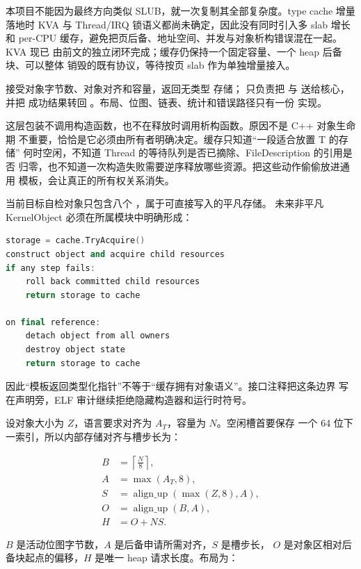 本项目不能因为最终方向类似 SLUB，就一次复制其全部复杂度。type cache 增量
落地时 KVA 与 Thread/IRQ 锁语义都尚未确定，因此没有同时引入多 slab 增长和
per-CPU 缓存，避免把页后备、地址空间、并发与对象析构错误混在一起。KVA 现已
由前文的独立闭环完成；缓存仍保持一个固定容量、一个 heap 后备块、可以整体
销毁的既有协议，等待按页 slab 作为单独增量接入。

 接受对象字节数、对象对齐和容量，返回无类型
存储； 只负责把
 与  送给核心，并把
成功结果转回 。布局、位图、链表、统计和错误路径只有一份
实现。

这层包装不调用构造函数，也不在释放时调用析构函数。原因不是 C++ 对象生命期
不重要，恰恰是它必须由所有者明确决定。缓存只知道“一段适合放置 T 的存储”
何时空闲，不知道 Thread 的等待队列是否已摘除、FileDescription 的引用是否
归零，也不知道一次构造失败需要逆序释放哪些资源。把这些动作偷偷放进通用
模板，会让真正的所有权关系消失。

当前目标自检对象只包含八个 ，属于可直接写入的平凡存储。
未来非平凡 KernelObject 必须在所属模块中明确形成：

\begin{lstlisting}[language=C++]
storage = cache.TryAcquire()
construct object and acquire child resources
if any step fails:
    roll back committed child resources
    return storage to cache

on final reference:
    detach object from all owners
    destroy object state
    return storage to cache
\end{lstlisting}

因此“模板返回类型化指针”不等于“缓存拥有对象语义”。接口注释把这条边界
写在声明旁，ELF 审计继续拒绝隐藏构造器和运行时符号。

设对象大小为 \(Z\)，语言要求对齐为 \(A_T\)，容量为 \(N\)。空闲槽首要保存
一个 64 位下一索引，所以内部存储对齐与槽步长为：

\[
\begin{aligned}
 B &= \left\lceil\frac{N}{8}\right\rceil,\\
 A &= \max(A_T,8),\\
 S &= \operatorname{align\_up}(\max(Z,8),A),\\
 O &= \operatorname{align\_up}(B,A),\\
 H &= O+N S.
\end{aligned}
\]

\(B\) 是活动位图字节数，\(A\) 是后备申请所需对齐，\(S\) 是槽步长，
\(O\) 是对象区相对后备块起点的偏移，\(H\) 是唯一 heap 请求长度。布局为：

